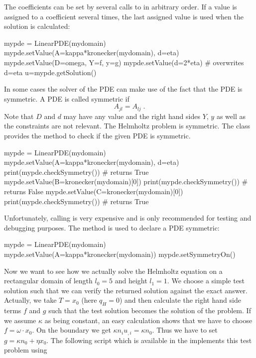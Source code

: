 The coefficients can be set by several calls to  in arbitrary
order. 
If a value is assigned to a coefficient several times, the last assigned value
is used when the solution is calculated:
\begin{python}
  mypde = LinearPDE(mydomain)
  mypde.setValue(A=kappa*kronecker(mydomain), d=eta)
  mypde.setValue(D=omega, Y=f, y=g)
  mypde.setValue(d=2*eta) # overwrites d=eta
  u=mypde.getSolution()
\end{python}
In some cases the solver of the PDE can make use of the fact that the PDE is
symmetric. A PDE is called symmetric if
\begin{equation}\label{LINEARPDE.SINGLE.4  TUTORIAL}
A_{jl}=A_{lj}\;.
\end{equation}
Note that $D$ and $d$ may have any value and the right hand sides $Y$, $y$ as
well as the constraints are not relevant. The Helmholtz problem is symmetric.
The \LinearPDE class provides the method  to check if
the given PDE is symmetric.
\begin{python}
  mypde = LinearPDE(mydomain)
  mypde.setValue(A=kappa*kronecker(mydomain), d=eta)
  print(mypde.checkSymmetry()) # returns True
  mypde.setValue(B=kronecker(mydomain)[0])
  print(mypde.checkSymmetry()) # returns False
  mypde.setValue(C=kronecker(mydomain)[0])
  print(mypde.checkSymmetry()) # returns True
\end{python}
Unfortunately, calling  is very expensive and is only
recommended for testing and debugging purposes.
The  method is used to declare a PDE symmetric:
\begin{python}
  mypde = LinearPDE(mydomain)
  mypde.setValue(A=kappa*kronecker(mydomain))
  mypde.setSymmetryOn()
\end{python}
Now we want to see how we actually solve the Helmholtz equation on a
rectangular domain of length $l_{0}=5$ and height $l_{1}=1$.
We choose a simple test solution such that we can verify the returned solution
against the exact answer. Actually, we take $T=x_{0}$ (here
$q_H = 0$) and then calculate the right hand side terms $f$ and $g$
such that the test solution becomes the solution of the problem.
If we assume $\kappa$ as being constant, an easy calculation shows that we
have to choose $f=\omega \cdot x_{0}$.
On the boundary we get $\kappa n_{i} u_{,i}=\kappa n_{0}$.
Thus we have to set $g=\kappa n_{0}+\eta x_{0}$.
The following script 
which is available in the \ExampleDirectory implements this test problem using
